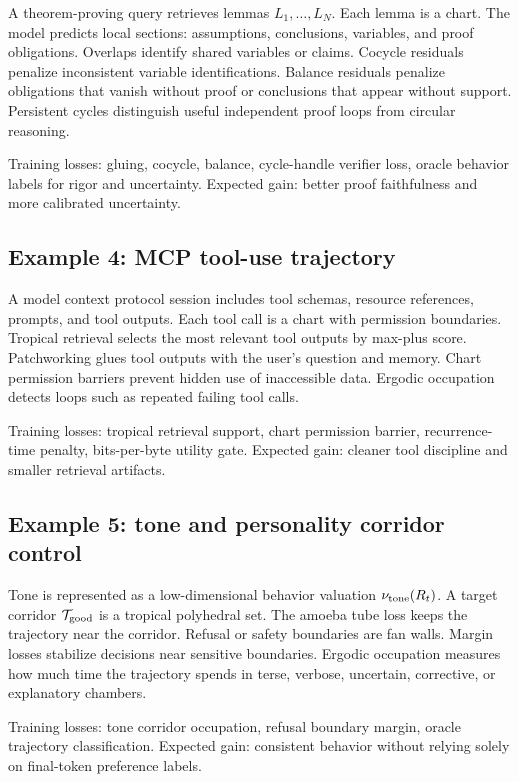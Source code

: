 \documentclass[11pt]{article}
\newcommand{\calT}{\mathcal{T}}
\begin{document}
A theorem-proving query retrieves lemmas \(L_1,
\ldots,L_N\).  Each lemma is a chart.  The model predicts local sections: assumptions, conclusions, variables, and proof obligations.  Overlaps identify shared variables or claims.  Cocycle residuals penalize inconsistent variable identifications.  Balance residuals penalize obligations that vanish without proof or conclusions that appear without support.  Persistent cycles distinguish useful independent proof loops from circular reasoning.

Training losses: gluing, cocycle, balance, cycle-handle verifier loss, oracle behavior labels for rigor and uncertainty.  Expected gain: better proof faithfulness and more calibrated uncertainty.

\subsection{Example 4: MCP tool-use trajectory}

A model context protocol session includes tool schemas, resource references, prompts, and tool outputs.  Each tool call is a chart with permission boundaries.  Tropical retrieval selects the most relevant tool outputs by max-plus score.  Patchworking glues tool outputs with the user's question and memory.  Chart permission barriers prevent hidden use of inaccessible data.  Ergodic occupation detects loops such as repeated failing tool calls.

Training losses: tropical retrieval support, chart permission barrier, recurrence-time penalty, bits-per-byte utility gate.  Expected gain: cleaner tool discipline and smaller retrieval artifacts.

\subsection{Example 5: tone and personality corridor control}

Tone is represented as a low-dimensional behavior valuation \(\nu_{\rm tone}(R_t)\).  A target corridor \(\calT_{\rm good}\) is a tropical polyhedral set.  The amoeba tube loss keeps the trajectory near the corridor.  Refusal or safety boundaries are fan walls.  Margin losses stabilize decisions near sensitive boundaries.  Ergodic occupation measures how much time the trajectory spends in terse, verbose, uncertain, corrective, or explanatory chambers.

Training losses: tone corridor occupation, refusal boundary margin, oracle trajectory classification.  Expected gain: consistent behavior without relying solely on final-token preference labels.
\end{document}
